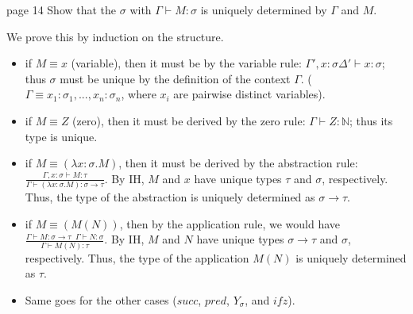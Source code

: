 \begin{problem}{page 14}
 Show that the $\sigma$ with $\Gamma \vdash M:\sigma$ is uniquely determined by $\Gamma$ and $M$.
\end{problem}

\begin{solution}
    We prove this by induction on the structure.
    \begin{itemize}
        \item if $M \equiv x$ (variable), then it must be by the variable rule: $\Gamma', x:\sigma \Delta' \vdash x:\sigma$; thus $\sigma$ must be unique by the definition of the context $\Gamma$.
                ($\Gamma \equiv x_1:\sigma_1, ..., x_n:\sigma_n$, where $x_i$ are pairwise distinct variables).
        
        \item if $M \equiv Z$ (zero), then it must be derived by the zero rule: $\Gamma \vdash Z:\mathbb{N}$; thus its type is unique.
        
        \item if $M \equiv (\lambda x:\sigma.M)$, then it must be derived by the abstraction rule: $\frac{\Gamma, x:\sigma \vdash M:\tau}{\Gamma \vdash (\lambda x:\sigma.M):\sigma \to \tau}$.
                By IH, $M$ and $x$ have unique types $\tau$ and $\sigma$, respectively. Thus, the type of the abstraction is uniquely determined as $\sigma \to \tau$.
                
        \item if $M \equiv (M(N))$, then by the application rule, we would have $\frac{\Gamma \vdash M:\sigma \to \tau \;\; \Gamma \vdash N:\sigma}{\Gamma \vdash M(N) : \tau}$.
                By IH, $M$ and $N$ have unique types $\sigma \to \tau$ and $\sigma$, respectively. Thus, the type of the application $M(N)$ is uniquely determined as $\tau$.

        \item Same goes for the other cases ($succ$, $pred$, $Y_\sigma$, and $ifz$).
    \end{itemize}
\end{solution}